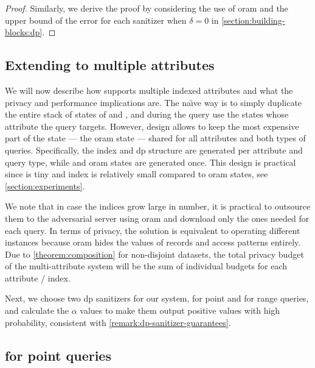 		\begin{proof}
			Similarly, we derive the proof by considering the use of \acrshort{oram} and the upper bound of the error for each sanitizer when $\delta = 0$ in \cref{section:building-blocks:dp}.
		\end{proof}

	\subsection{Extending to multiple attributes}\label{section:dp-oram:multiple-attributes}

		We will now describe how \epsolute{} supports multiple indexed attributes and what the privacy and performance implications are.
		The na\"{\i}ve way is to simply duplicate the entire stack of states of \user{} and \server{}, and during the query use the states whose attribute the query targets.
		However, \epsolute{} design allows to keep the most expensive part of the state --- the \acrshort{oram} state --- shared for all attributes and both types of queries.
		Specifically, the index \indexI{} and \acrshort{dp} structure \serverDS{} are generated per attribute and query type, while \user{} and \server{} \acrshort{oram} states are generated once.
		This design is practical since \serverDS{} is tiny and index \indexI{} is relatively small compared to \acrshort{oram} states, see \cref{section:experiments}.

		We note that in case the indices grow large in number, it is practical to outsource them to the adversarial server using \acrshort{oram} and download only the ones needed for each query.
		In terms of privacy, the solution is equivalent to operating different \epsolute{} instances because \acrshort{oram} hides the values of records and access patterns entirely.
		Due to \cref{theorem:composition} for non-disjoint datasets, the total privacy budget of the multi-attribute system will be the sum of individual budgets for each attribute / index.

		Next, we choose two \acrshort{dp} sanitizers for our system, for point and for range queries, and calculate the $\alpha$ values to make them output positive values with high probability, consistent with \cref{remark:dp-sanitizer-guarantees}.

	\subsection{\texorpdfstring{\epsolute{}}{Epsolute} for point queries}\label{section:dp-oram:point}

